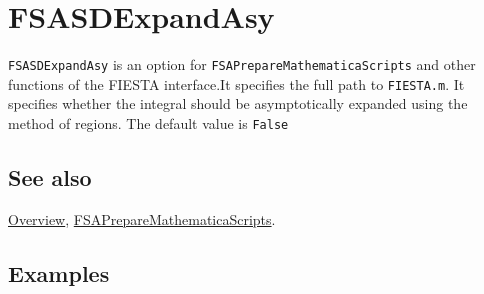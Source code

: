 \documentclass[../FeynHelpersManual.tex]{subfiles}
\begin{document}
\begin{Shaded}
\begin{Highlighting}[]
 
\end{Highlighting}
\end{Shaded}

\hypertarget{fsasdexpandasy}{
\section{FSASDExpandAsy}\label{fsasdexpandasy}}

\texttt{FSASDExpandAsy} is an option for
\texttt{FSAPrepareMathematicaScripts} and other functions of the FIESTA
interface.It specifies the full path to \texttt{FIESTA.m}. It specifies
whether the integral should be asymptotically expanded using the method
of regions. The default value is \texttt{False}

\subsection{See also}

\hyperlink{toc}{Overview},
\hyperlink{fsapreparemathematicascripts}{FSAPrepareMathematicaScripts}.

\subsection{Examples}
\end{document}
